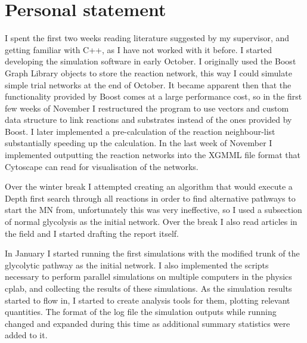 \documentclass[a4paper,12pt]{article}
\begin{document}
%	
%
%
%
%
%
%


	\newpage
	\section*{Personal statement}
	I spent the first two weeks reading literature suggested by my supervisor, and getting familiar with C++, as I have not worked with it before. 
	I started developing the simulation software in early October. 	I originally used the Boost Graph Library objects to store the reaction network, this way I could simulate simple trial networks at the end of October. It became apparent then that the functionality provided by Boost comes at a large performance cost, so in the first few weeks of November I restructured the program to use vectors and custom data structure to link reactions and substrates instead of the ones provided by Boost. I later implemented a pre-calculation of the reaction neighbour-list substantially speeding up the calculation. 
	In the last week of November I implemented outputting the reaction networks into the XGMML file format that Cytoscape can read for visualisation of the networks. 

	Over the winter break I attempted creating an algorithm that would execute a Depth first search through all reactions in order to find alternative pathways to start the MN from, unfortunately this was very ineffective, so I used a subsection of normal glycolysis as the initial network. Over the break I also read articles in the field and I started drafting the report itself. 

	In January I started running the first simulations with the modified trunk of the glycolytic pathway as the initial network. I also implemented the scripts necessary to perform parallel simulations on multiple computers in the physics cplab, and collecting the results of these simulations. 
	As the simulation results started to flow in, I started to create analysis tools for them, plotting relevant quantities. The format of the log file the simulation outputs while running changed and expanded during this time as additional summary statistics were added to it. 
\end{document}
